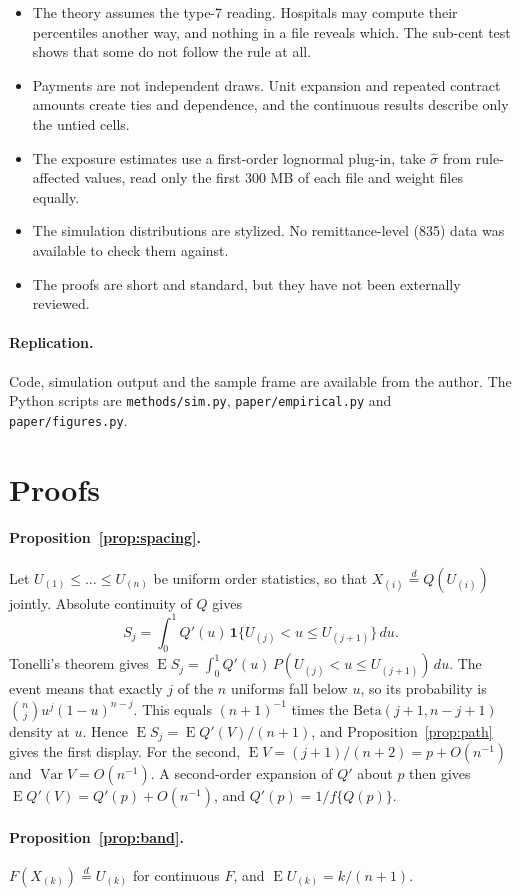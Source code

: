 \documentclass[11pt]{article}
\theoremstyle{remark}
\DeclareMathOperator{\E}{E}
\begin{document}
\begin{itemize}
\item The theory assumes the type-7 reading. Hospitals may compute their percentiles another way, and nothing in a file reveals which. The sub-cent test shows that some do not follow the rule at all.
\item Payments are not independent draws. Unit expansion and repeated contract amounts create ties and dependence, and the continuous results describe only the untied cells.
\item The exposure estimates use a first-order lognormal plug-in, take $\hat\sigma$ from rule-affected values, read only the first 300 MB of each file and weight files equally.
\item The simulation distributions are stylized. No remittance-level (835) data was available to check them against.
\item The proofs are short and standard, but they have not been externally reviewed.
\end{itemize}

\paragraph{Replication.} Code, simulation output and the sample frame are available from the author. The Python scripts are \texttt{methods/sim.py}, \texttt{paper/empirical.py} and \texttt{paper/figures.py}.

\appendix
\section{Proofs}\label{app:proofs}

\paragraph{Proposition~\ref{prop:spacing}.} Let $U_{(1)}\le\dots\le U_{(n)}$ be uniform order statistics, so that $X_{(i)}\overset{d}{=}Q(U_{(i)})$ jointly. Absolute continuity of $Q$ gives
\[
S_j=\int_0^1 Q'(u)\,\mathbf 1\{U_{(j)}<u\le U_{(j+1)}\}\,du .
\]
Tonelli's theorem gives $\E S_j=\int_0^1 Q'(u)\,P(U_{(j)}<u\le U_{(j+1)})\,du$. The event means that exactly $j$ of the $n$ uniforms fall below $u$, so its probability is $\binom nj u^j(1-u)^{n-j}$. This equals $(n+1)^{-1}$ times the $\mathrm{Beta}(j+1,n-j+1)$ density at $u$. Hence $\E S_j=\E Q'(V)/(n+1)$, and Proposition~\ref{prop:path} gives the first display. For the second, $\E V=(j+1)/(n+2)=p+O(n^{-1})$ and $\operatorname{Var}V=O(n^{-1})$. A second-order expansion of $Q'$ about $p$ then gives $\E Q'(V)=Q'(p)+O(n^{-1})$, and $Q'(p)=1/f\{Q(p)\}$.

\paragraph{Proposition~\ref{prop:band}.} $F(X_{(k)})\overset{d}{=}U_{(k)}$ for continuous $F$, and $\E U_{(k)}=k/(n+1)$.



\end{document}
